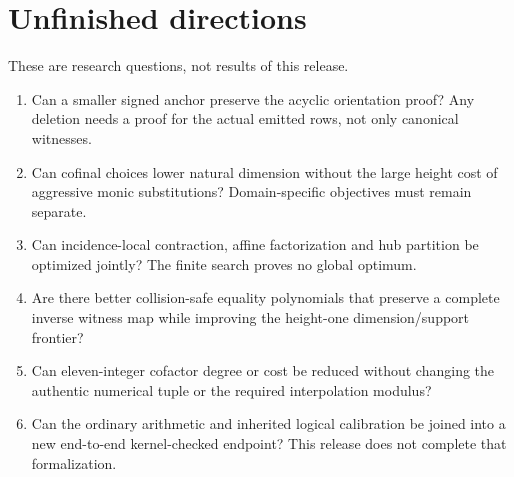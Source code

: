 \section{Unfinished directions}
These are research questions, not results of this release.
\begin{enumerate}
\item Can a smaller signed anchor preserve the acyclic orientation proof? Any deletion needs a proof for the actual emitted rows, not only canonical witnesses.
\item Can cofinal choices lower natural dimension without the large height cost of aggressive monic substitutions? Domain-specific objectives must remain separate.
\item Can incidence-local contraction, affine factorization and hub partition be optimized jointly? The finite search proves no global optimum.
\item Are there better collision-safe equality polynomials that preserve a complete inverse witness map while improving the height-one dimension/support frontier?
\item Can eleven-integer cofactor degree or cost be reduced without changing the authentic numerical tuple or the required interpolation modulus?
\item Can the ordinary arithmetic and inherited logical calibration be joined into a new end-to-end kernel-checked endpoint? This release does not complete that formalization.
\end{enumerate}
